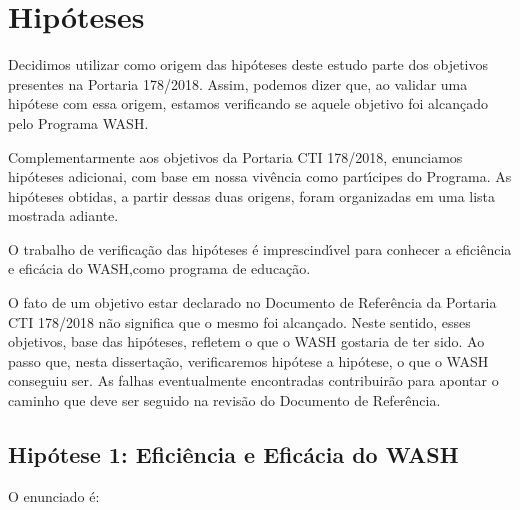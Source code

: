 \documentclass[
12pt,		%
openright,	%
twoside,  %
a4paper,			%
chapter=TITLE,		%
english,			%
french,				%
spanish,			%
brazil				%
]{USPSC-classe/USPSC}
\begin{document}
\section[Hip\'oteses]{Hip\'oteses}\label{Hip\'oteses}
Decidimos utilizar como origem das hip\'oteses deste estudo parte dos objetivos presentes na Portaria 178/2018. Assim, podemos dizer que, ao validar uma hip\'otese com essa origem, estamos verificando se aquele objetivo foi alcan\c{c}ado pelo Programa WASH.








Complementarmente aos objetivos da Portaria CTI 178/2018, enunciamos hip\'oteses adicionai, com base em nossa viv\^encia como part\'{\i}cipes do Programa. As hip\'oteses obtidas, a partir dessas duas origens, foram organizadas em uma lista mostrada adiante.








O trabalho de verifica\c{c}\~ao das hip\'oteses \'e imprescind\'{\i}vel para conhecer a efici\^encia e efic\'acia do WASH,como programa de educa\c{c}\~ao.








O fato de um objetivo estar declarado no Documento de Refer\^encia da Portaria CTI 178/2018 n\~ao significa que o mesmo foi alcan\c{c}ado. Neste sentido, esses objetivos, base das hip\'oteses, refletem \textquotedbl o que o WASH gostaria de ter sido\textquotedbl . Ao passo que, nesta disserta\c{c}\~ao, verificaremos hip\'otese a hip\'otese, \textquotedbl o que o WASH conseguiu ser\textquotedbl . As falhas eventualmente encontradas contribuir\~ao para apontar o caminho que deve ser seguido na revis\~ao do Documento de Refer\^encia.








\subsection[Hip\'otese 1: Efici\^encia e Efic\'acia do WASH]{Hip\'otese 1: Efici\^encia e Efic\'acia do WASH}\label{Hip\'otese 1: Efici\^encia e Efic\'acia do WASH}
O enunciado \'e:
\end{document}
